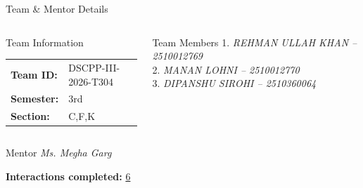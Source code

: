 \documentclass[aspectratio=169,11pt]{beamer}
\newcommand{\placeholder}[1]{%
\textit{\color{GEUGrey}#1}
}
\begin{document}
\begin{frame}{Team \& Mentor Details}

\begin{columns}[T,totalwidth=\textwidth]


\begin{block}{Team Information}
\begin{tabular}{@{}ll@{}}
\textbf{Team ID:} & DSCPP-III-2026-T304\\
\textbf{Semester:} & 3rd\\
\textbf{Section:} & C,F,K\\
\end{tabular}
\end{block}


\begin{block}{Team Members}
1.\quad \placeholder{REHMAN ULLAH KHAN -- 2510012769}\\
2.\quad \placeholder{MANAN LOHNI -- 2510012770}\\
3.\quad \placeholder{DIPANSHU SIROHI -- 2510360064}\\
\end{block}

\end{columns}

\vspace{2mm}

\begin{block}{Mentor}
\placeholder{ Ms. Megha Garg}
\hfill
\textbf{Interactions completed:}
\underline{   6\hspace{12mm}}
\end{block}

\vfill

\end{frame}
\end{document}
